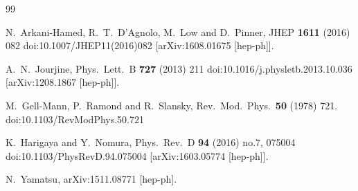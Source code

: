 \documentclass[a4paper]{article}
\begin{document}
\begin{thebibliography}{99}

  N.~Arkani-Hamed, R.~T.~D'Agnolo, M.~Low and D.~Pinner,
  JHEP {\bf 1611} (2016) 082
  doi:10.1007/JHEP11(2016)082
  [arXiv:1608.01675 [hep-ph]].

  A.~N.~Jourjine,
  Phys.\ Lett.\ B {\bf 727} (2013) 211
  doi:10.1016/j.physletb.2013.10.036
  [arXiv:1208.1867 [hep-ph]].

  M.~Gell-Mann, P.~Ramond and R.~Slansky,
  Rev.\ Mod.\ Phys.\  {\bf 50} (1978) 721.
  doi:10.1103/RevModPhys.50.721

  K.~Harigaya and Y.~Nomura,
  Phys.\ Rev.\ D {\bf 94} (2016) no.7,  075004
  doi:10.1103/PhysRevD.94.075004
  [arXiv:1603.05774 [hep-ph]].
  
  N.~Yamatsu,
  arXiv:1511.08771 [hep-ph].
\end{thebibliography}
\end{document}
